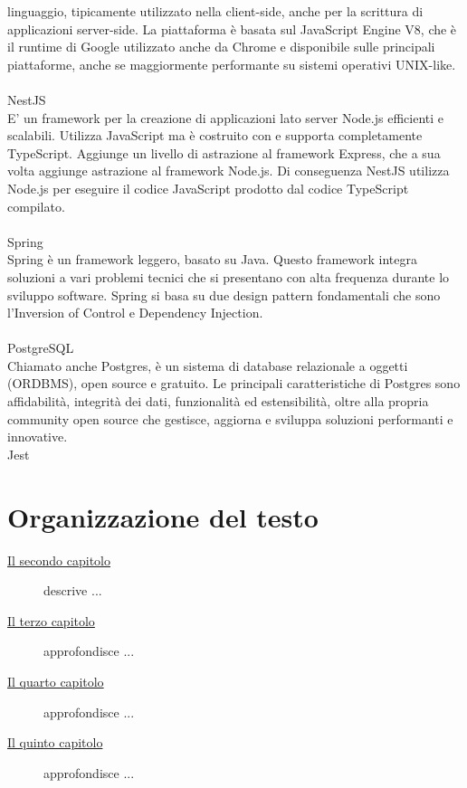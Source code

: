 linguaggio, tipicamente utilizzato nella client-side, anche per la scrittura di applicazioni server-side.
La piattaforma è basata sul JavaScript Engine V8, che è il runtime di Google utilizzato anche da Chrome e 
disponibile sulle principali piattaforme, anche se maggiormente performante su sistemi operativi UNIX-like.
\\\\
NestJS
\\
E' un framework per la creazione di applicazioni lato server Node.js efficienti e scalabili. 
Utilizza JavaScript ma è costruito con e supporta completamente TypeScript. Aggiunge un livello di astrazione
al framework Express, che a sua volta aggiunge astrazione al framework Node.js. Di conseguenza NestJS 
utilizza Node.js per eseguire il codice JavaScript prodotto dal codice TypeScript compilato.
\\\\
Spring
\\
Spring è un framework leggero, basato su Java. Questo framework integra soluzioni a vari problemi tecnici
che si presentano con alta frequenza durante lo sviluppo software. Spring si basa su due design pattern
fondamentali che sono l'Inversion of Control e Dependency Injection.
\\\\
PostgreSQL
\\
Chiamato anche Postgres, è un sistema di database relazionale a oggetti (ORDBMS), open source e 
gratuito.
Le principali caratteristiche di Postgres sono affidabilità, integrità dei dati, funzionalità ed estensibilità, 
oltre alla propria community open source che gestisce, aggiorna e sviluppa soluzioni performanti e innovative.
\\
Jest

\section{Organizzazione del testo}

\begin{description}
    \item[{\hyperref[cap:analisi-requisiti]{Il secondo capitolo}}] descrive ...
    
    \item[{\hyperref[cap:progettazione]{Il terzo capitolo}}] approfondisce ...
    
    \item[{\hyperref[cap:realizzazione-e-testing]{Il quarto capitolo}}] approfondisce ...
    
    \item[{\hyperref[cap:conclusioni]{Il quinto capitolo}}] approfondisce ...
\end{description}

